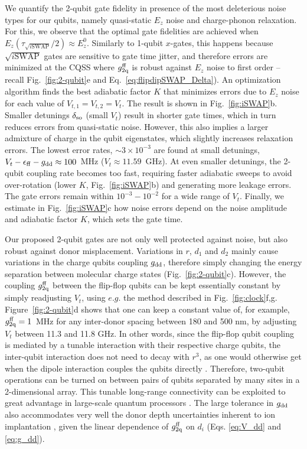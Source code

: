 We quantify the 2-qubit gate fidelity in presence of the most deleterious noise types for our qubits, namely quasi-static $E_z$ noise and charge-phonon relaxation. For this, we observe that the optimal gate fidelities are achieved when $E_z(\tau_{\sqrt{i\mathrm{SWAP}}}/2)\approx E_z^0$. Similarly to 1-qubit $x$-gates, this happens because $\sqrt{i\mathrm{SWAP}}$ gates are sensitive to gate time jitter, and therefore errors are minimized at the CQSS where $g_{\rm 2q}^{\rm ff}$ is robust against $E_z$ noise to first order -- recall Fig.~\ref{fig:2-qubit}e and Eq.~\ref{eq:flipdipSWAP_Delta}). An optimization algorithm finds the best adiabatic factor $K$ that minimizes errors due to $E_z$ noise for each value of $V_{t,1}=V_{t,2}=V_t$. The result is shown in Fig.~\ref{fig:iSWAP}b. Smaller detunings $\delta_{\rm so}$ (small $V_t$) result in shorter gate times, which in turn reduces errors from quasi-static noise. However, this also implies a larger admixture of charge in the qubit eigenstates, which slightly increases relaxation errors. The lowest error rates, $\sim3\times10^{-3}$ are found at small detunings, $V_t-\epsilon_{\rm ff}-g_{\rm dd}\approx 100$~MHz ($V_t\approx11.59$~GHz). At even smaller detunings, the 2-qubit coupling rate becomes too fast, requiring faster adiabatic sweeps to avoid over-rotation (lower $K$, Fig.~\ref{fig:iSWAP}b) and generating more leakage errors. The gate errors remain within $10^{-3}-10^{-2}$ for a wide range of $V_t$. Finally, we estimate in Fig.~\ref{fig:iSWAP}c how noise errors depend on the noise amplitude and adiabatic factor $K$, which sets the gate time.

Our proposed 2-qubit gates are not only well protected against noise, but also robust against donor misplacement. Variations in $r$, $d_1$ and $d_2$ mainly cause variations in the charge qubits coupling $g_{\rm dd}$, therefore simply changing the energy separation between molecular charge states (Fig.~\ref{fig:2-qubit}c). However, the coupling $g_{\rm 2q}^{\rm ff}$ between the flip-flop qubits can be kept essentially constant by simply readjusting $V_t$, using $e.g.$ the method described in Fig.~\ref{fig:clock}f,g. Figure~\ref{fig:2-qubit}d shows that one can keep a constant value of, for example, $g_{\rm 2q}^{\rm ff} = 1$~MHz for any inter-donor spacing between 180 and 500 nm, by adjusting $V_t$ between 11.3 and 11.8 GHz. In other words, since the flip-flop qubit coupling is mediated by a tunable interaction with their respective charge qubits, the inter-qubit interaction does not need to decay with $r^3$, as one would otherwise get when the dipole interaction couples the qubits directly \cite{Ogorman2014,Hill2015}. Therefore, two-qubit operations can be turned on between pairs of qubits separated by many sites in a 2-dimensional array. This tunable long-range connectivity can be exploited to great advantage in large-scale quantum processors \cite{Li2017}. The large tolerance in $g_{\rm dd}$ also accommodates very well the donor depth uncertainties inherent to ion implantation \cite{Donkelaar2015}, given the linear dependence of $g_{\rm 2q}^{\rm ff}$ on $d_i$ (Eqs. \ref{eq:V_dd} and \ref{eq:g_dd}).  

